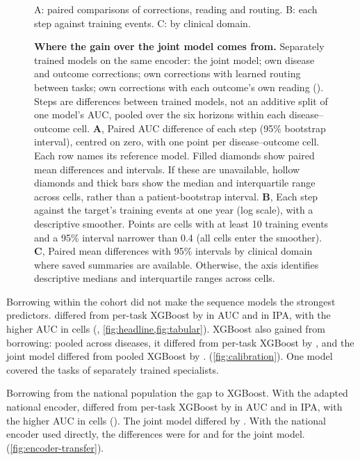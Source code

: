 \begin{figure}[H]
    {A: paired comparisons of corrections, reading and routing. B: each step against training
    events. C: by clinical domain.}
  \caption{\textbf{Where the gain over the joint model comes from.} Separately
  trained models on the same encoder: the joint model; own disease and outcome
  corrections; own corrections with learned routing between tasks; own
  corrections with each outcome's own reading (\opera{}). Steps are differences
  between trained models, not an additive split of one model's AUC, pooled over
  the six horizons within each disease--outcome cell. \textbf{A}, Paired AUC
  difference of each step (95\% bootstrap interval), centred on zero, with
  one point per disease--outcome cell. Each row names its reference model.
  Filled diamonds show paired mean differences and intervals. If these are
  unavailable, hollow diamonds and thick bars show the median and interquartile
  range across cells, rather than a patient-bootstrap interval. \textbf{B}, Each step
  against the target's training events at one year (log scale), with a
  descriptive smoother. Points are cells with at least 10 training events and a
  95\% interval narrower than 0.4 (all cells enter the smoother). \textbf{C},
  Paired mean differences with 95\% intervals by clinical domain where saved
  summaries are available. Otherwise, the axis identifies descriptive medians
  and interquartile ranges across cells.}
  \label{fig:gain-sources}
\end{figure}

\FloatBarrier
{}
Borrowing within the cohort did not make the sequence models the strongest
predictors.
\opera{} differed from per-task XGBoost by  in AUC and
 in IPA, with the higher AUC in 
cells (, \cref{fig:headline,fig:tabular}). XGBoost also gained from
borrowing: pooled across diseases, it differed from per-task XGBoost by
, and the joint model differed from pooled XGBoost by
. 
 (\cref{fig:calibration}).
One \opera{} model covered the tasks of  separately
trained specialists.

Borrowing from the national population  the gap to XGBoost. With the adapted national encoder, \opera{} differed from
per-task XGBoost by  in AUC and 
in IPA, with the higher AUC in  cells
(). The joint model differed by
. With the national encoder used directly, the
differences were  for \opera{} and
 for the joint model.  (\cref{fig:encoder-transfer}).

